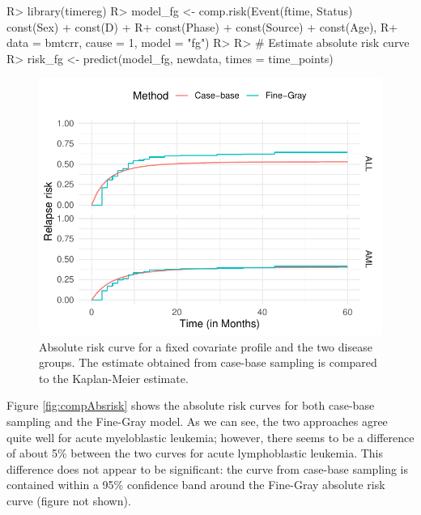 \documentclass[
]{jss}
\begin{document}
\begin{CodeChunk}

\begin{CodeInput}
R> library(timereg)
R> model_fg <- comp.risk(Event(ftime, Status) ~ const(Sex) + const(D) + 
R+                           const(Phase) + const(Source) + const(Age), 
R+                       data = bmtcrr, cause = 1, model = "fg")
R> 
R> # Estimate absolute risk curve
R> risk_fg <- predict(model_fg, newdata, times = time_points)
\end{CodeInput}
\end{CodeChunk}

\begin{CodeChunk}
\begin{figure}

{\centering \includegraphics{../figures/bmtcrr-risk-1} 

}

\caption{\label{fig:compAbsrisk}Absolute risk curve for a fixed covariate profile and the two disease groups. The estimate obtained from case-base sampling is compared to the Kaplan-Meier estimate.}\label{fig:bmtcrr-risk}
\end{figure}
\end{CodeChunk}

Figure \ref{fig:compAbsrisk} shows the absolute risk curves for both
case-base sampling and the Fine-Gray model. As we can see, the two
approaches agree quite well for acute myeloblastic leukemia; however,
there seems to be a difference of about 5\% between the two curves for
acute lymphoblastic leukemia. This difference does not appear to be
significant: the curve from case-base sampling is contained within a
95\% confidence band around the Fine-Gray absolute risk curve (figure
not shown).
\end{document}
